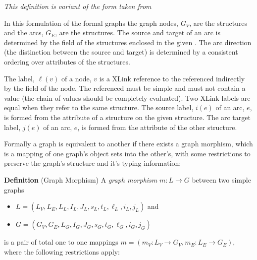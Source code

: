 \documentclass{cekarticle}
\begin{document}
\emph{This definition is variant of the form taken from
\citep{rudolf:1998}}

In this formulation of the formal graphs the graph nodes, $G_{V}$,
are the  structures and the arcs,
$G_{E}$, are the  structures.  The source and
target of an arc is determined by the 
field of the  structures enclosed in
the given . The arc direction (the distinction
between the source and target) is determined by a consistent
ordering over  attributes of the
 structures.

The label, $\ell(v)$ of a node, $v$ is a XLink reference to the
 referenced indirectly by the
 field of the node.  The referenced
 must be simple and must not contain a
 value (the chain of  values should be
completely evaluated).  Two XLink labels are equal when they refer
to the same  structure. The source label,
$i(e)$ of an arc, $e$, is formed from the 
attribute of a  structure on the given
 structure. The arc target label, $j(e)$ of an
arc, $e$, is formed from the  attribute of the
other  structure.

Formally a graph is equivalent to another if there exists a graph
morphism, which is a mapping of one graph's object sets into the
other's, with some restrictions to preserve the graph's structure
and it's typing information:

\textbf{Definition} (Graph Morphism) A \emph{graph morphism} $m : L \rightarrow G$ between two
simple graphs
\begin{itemize}
\item $L = (L_{V}, L_{E}, L_{L}, I_{L}, J_{L}, s_{L}, t_{L}, \ell_{L}, i_{L}, j_{L})$ and
\item $G = (G_{V}, G_{E}, L_{G}, I_{G}, J_{G}, s_{G}, t_{G}, \ell_{G}, i_{G}, j_{G})$
\end{itemize}
is a pair of total one to one mappings $m = (m_{V} : L_{V}
\rightarrow G_{V}, m_{E} : L_{E} \rightarrow G_{E})$, where the
following restrictions apply:
\end{document}
